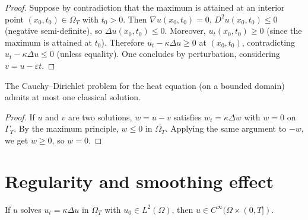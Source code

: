 \begin{proof}
Suppose by contradiction that the maximum is attained at an interior point
$(x_0, t_0) \in \Omega_T$ with $t_0 > 0$. Then $\nabla u(x_0, t_0) = 0$,
$D^2 u(x_0, t_0) \leq 0$ (negative semi-definite), so
$\Delta u(x_0, t_0) \leq 0$. Moreover, $u_t(x_0, t_0) \geq 0$ (since the
maximum is attained at $t_0$). Therefore
$u_t - \kappa\Delta u \geq 0$ at $(x_0, t_0)$, contradicting
$u_t - \kappa\Delta u \leq 0$ (unless equality). One concludes by
perturbation, considering $v = u - \varepsilon t$.
\end{proof}

\begin{center}
\end{center}

\begin{corollary}[Uniqueness]
The Cauchy--Dirichlet problem for the heat equation (on a bounded domain)
admits at most one classical solution.
\end{corollary}

\begin{proof}
If $u$ and $v$ are two solutions, $w = u - v$ satisfies $w_t = \kappa\Delta w$
with $w = 0$ on $\Gamma_T$. By the maximum principle, $w \leq 0$ in
$\overline{\Omega_T}$. Applying the same argument to $-w$, we get
$w \geq 0$, so $w = 0$.
\end{proof}

\section{Regularity and smoothing effect}

\begin{theorem}
If $u$ solves $u_t = \kappa\Delta u$ in $\Omega_T$ with
$u_0 \in L^2(\Omega)$, then $u \in C^\infty(\Omega \times (0,T])$.
\end{theorem}

